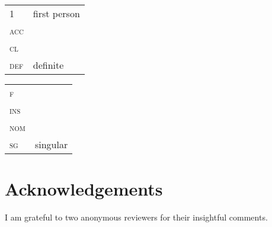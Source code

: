 \documentclass[output=paper,modfonts,newtxmath,hidelinks,]{langscibook}
\begin{document}
\begin{tabularx}{.5\textwidth}{@{}lQ@{}}
\textsc{1}&first person\\
\textsc{acc}&\\
\textsc{cl}&\\
\textsc{def}&definite\\
\end{tabularx}%
\begin{tabularx}{.5\textwidth}{@{}lQ@{}}
\textsc{f}&\\
\textsc{ins}&\\
\textsc{nom}&\\
\textsc{sg}&singular\\
\end{tabularx}

\section*{Acknowledgements}

I am grateful to two anonymous reviewers for their insightful comments.

\sloppy
\printbibliography[heading=subbibliography,notkeyword=this]
\end{document}
